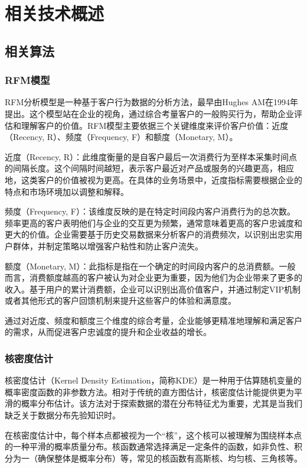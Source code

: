 \chapter{相关技术概述}
\section{相关算法}
\subsection{RFM模型}
RFM分析模型是一种基于客户行为数据的分析方法，最早由Hughes AM在1994年提出。这个模型站在企业的视角，通过综合考量客户的一般购买行为，帮助企业评估和理解客户的价值。RFM模型主要依据三个关键维度来评价客户价值：近度（Recency, R）、频度（Frequency, F）和额度（Monetary, M）。

近度（Recency, R）：此维度衡量的是自客户最后一次消费行为至样本采集时间点的间隔长度。这个间隔时间越短，表示客户最近对产品或服务的兴趣更高，相应地，这类客户的价值被视为更高。在具体的业务场景中，近度指标需要根据企业的特点和市场环境加以调整和解释。

频度（Frequency, F）：该维度反映的是在特定时间段内客户消费行为的总次数。频率更高的客户表明他们与企业的交互更为频繁，通常意味着更高的客户忠诚度和更大的价值。企业需要基于历史交易数据来分析客户的消费频次，以识别出忠实用户群体，并制定策略以增强客户粘性和防止客户流失。

额度（Monetary, M）：此指标是指在一个确定的时间段内客户的总消费额。一般而言，消费额度越高的客户被认为对企业更为重要，因为他们为企业带来了更多的收入。基于用户的累计消费额，企业可以识别出高价值客户，并通过制定VIP机制或者其他形式的客户回馈机制来提升这些客户的体验和满意度。

通过对近度、频度和额度三个维度的综合考量，企业能够更精准地理解和满足客户的需求，从而促进客户忠诚度的提升和企业收益的增长。
\subsection{核密度估计}
核密度估计（Kernel Density Estimation，简称KDE）是一种用于估算随机变量的概率密度函数的非参数方法。相对于传统的直方图估计，核密度估计能提供更为平滑的概率分布估计。该方法对于探索数据的潜在分布特征尤为重要，尤其是当我们缺乏关于数据分布先验知识时。

在核密度估计中，每个样本点都被视为一个“核”，这个核可以被理解为围绕样本点的一种平滑的概率质量分布。核函数通常选择满足一定条件的函数，如非负性、积分为一（确保整体是概率分布）等，常见的核函数有高斯核、均匀核、三角核等。

